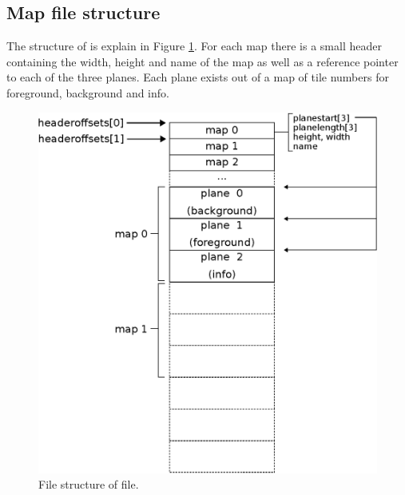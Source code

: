 \documentclass[book.tex]{subfiles}
\begin{document}
 
\subsection{Map file structure}
The structure of  is explain in Figure \ref{fig:map-file}. For each map there is a small header containing the width, height and name of the map as well as a reference pointer to each of the three planes. Each plane exists out of a map of tile numbers for foreground, background and info.
\begin{figure}[H]
\centering
 \includegraphics[width=\textwidth]{imgs/drawings/kdreams_map.eps}
 \caption{File structure of  file.}
 \label{fig:map-file}
\end{figure}
\end{document}
